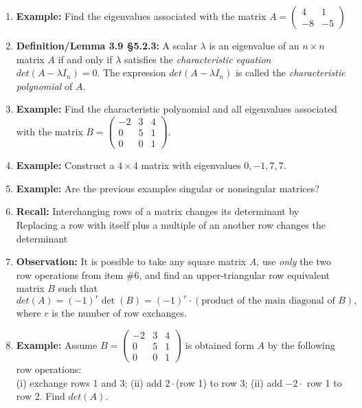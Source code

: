 \documentclass[11pt,fleqn]{article}
\begin{document}
\renewcommand{\headrulewidth}{0pt}
\newcommand{\blank}[1]{\rule{#1}{0.75pt}}
\renewcommand{\d}{\displaystyle}

\newcommand{\bpm}{\begin{pmatrix}}
\newcommand{\epm}{\end{pmatrix}}
\newcommand{\bbm}{\begin{bmatrix}}
\newcommand{\ebm}{\end{bmatrix}}

\vspace*{-0.7in}

\begin{center}
  \large {} \end{center}
 \begin{enumerate}
 \item \textbf{Example:} Find the eigenvalues associated with the matrix $A=\bpm 4&1 \\ -8 &-5 \epm$
 \vfill
 \item \textbf{Definition/Lemma 3.9 \S 5.2.3:} A scalar $\lambda$ is an eigenvalue of an $n \times n$ matrix $A$ if and only if $\lambda$ satisfies the \emph{characteristic equation} $det(A-\lambda I_n)=0.$ The expression $det(A-\lambda I_n)$ is called the \emph{characteristic polynomial} of $A.$
 
\item \textbf{Example:} Find the characteristic polynomial and all eigenvalues associated with the matrix $B=\bpm -2&3&4\\0&5&1\\0&0&1\epm.$

\vspace{1.5in} 

\item \textbf{Example:} Construct a $4 \times 4$ matrix with eigenvalues $0, -1, 7,7.$
\vspace{1.5in}
\item \textbf{Example:} Are the previous examples singular or nonsingular matrices?
\vspace{1in}

 \item \textbf{Recall:} Interchanging rows of a matrix changes its determinant by \\
 
 Replacing a row with itself plus a multiple of an another row changes the determinant \\
 \newpage
 \item \textbf{Observation:} It is possible to take any square matrix $A$, use \emph{only} the two row operations from item \#6, and find an upper-triangular row equivalent matrix $B$ such that $$det(A)=(-1)^r\det(B)=(-1)^r\cdot(\text{product of the main diagonal of }B),$$
 where $r$ is the number of row exchanges.
\item \textbf{Example:} Assume $B=\bpm -2&3&4\\0&5&1\\0&0&1\epm$ is obtained form $A$ by the following row operations:\\
(i) exchange rows 1 and 3; (ii) add $2\cdot$(row 1) to row 3; (ii) add $-2 \cdot$ row 1 to row 2. Find $det(A).$


\end{enumerate}
\end{document}
